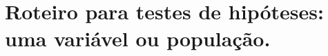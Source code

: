 \documentclass[8pt]{beamer}
\begin{document}
%
%	
%
%
\section{Roteiro para testes de hipóteses: uma variável ou população.}
\end{document}
